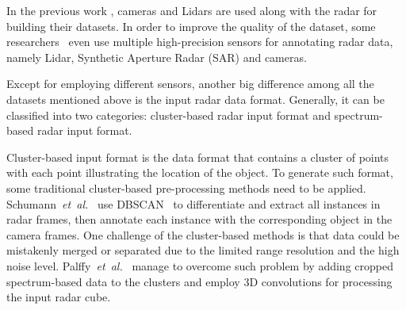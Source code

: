 \documentclass[10pt, conference, compsocconf]{IEEEtran}
\newcommand{\etal}{\textit{et~al.}}
\begin{document}

In the previous work \cite{Ref:DeepRadarDetector, Ref:RadarCamFusion, Ref:DeepOpenSpace, Ref:3DRadarCube, Ref:RADVehicle, Ref:ProbabilisticOriented}, cameras and Lidars are used along with the radar for building their datasets.
In order to improve the quality of the dataset, some researchers~\cite{Ref:HighResolutionRadarDataset} even use multiple high-precision sensors for annotating radar data, namely Lidar, Synthetic Aperture Radar (SAR) and cameras.

Except for employing different sensors, another big difference among all the datasets mentioned above is the input radar data format. Generally, it can be classified into two categories: cluster-based radar input format and spectrum-based radar input format.

Cluster-based input format is the data format that contains a cluster of points with each point illustrating the location of the object. To generate such format, some traditional cluster-based pre-processing methods need to be applied. Schumann~\etal~\cite{Ref:ClusterLSTM} use DBSCAN~\cite{BG:DBSCAN} to differentiate and extract all instances in radar frames, then annotate each instance with the corresponding object in the camera frames. 
One challenge of the cluster-based methods is that data could be mistakenly merged or separated due to the limited range resolution and the high noise level. Palffy~\etal~\cite{Ref:3DRadarCube} manage to overcome such problem by adding cropped spectrum-based data to the clusters and employ 3D convolutions for processing the input radar cube.
\end{document}
